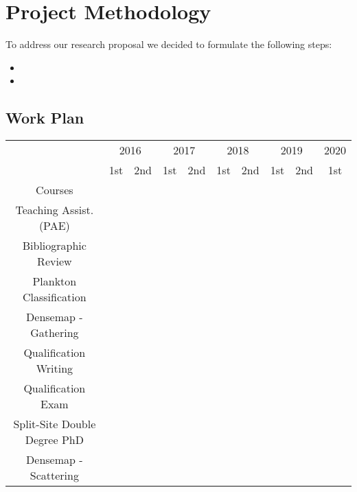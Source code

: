 \chapter{Project Methodology}
\label{ch04:methodology}

To address our research proposal we decided to formulate the following steps:

\begin{itemize}
\item 
\item 
\end{itemize}


\section{Work Plan}
\label{sec:work-plan}

\begin{table}[ht!]
  \center
  \begin{tabular}{|c|c|c|c|c|c|c|c|c|c|}\hline
    & \multicolumn{2}{c|}{2016} & \multicolumn{2}{c|}{2017} & \multicolumn{2}{c|}{2018} & \multicolumn{2}{c|}{2019} & \multicolumn{1}{c|}{2020} \\ \cline{2-10}
    \raisebox{1.5ex}{Activity} & 1st & 2nd & 1st & 2nd & 1st & 2nd & 1st & 2nd & 1st \\ \hline \hline
    Courses & \cellcolor{green!25} & \cellcolor{green!25} &  &  &  &  & & & \\ \hline
    Teaching Assist. (PAE) & & & \cellcolor{green!25} &  &  &  & & & \\ \hline
    Bibliographic Review & \cellcolor{green!25} & \cellcolor{green!25} & \cellcolor{green!25} & \cellcolor{green!25} & \cellcolor{green!25} & \cellcolor{blue!25} & \cellcolor{blue!25} & \cellcolor{blue!25} & \\ \hline 
    Plankton Classification & & & \cellcolor{green!25} & \cellcolor{green!25} &  & & &  & \\ \hline
    Densemap - Gathering & & & &  & \cellcolor{green!25}  & & &  & \\ \hline
    Qualification Writing & & & & & \cellcolor{green!25} & &  & & \\ \hline
    Qualification Exam & & & & & \cellcolor{green!25} & & & & \\ \hline
    Split-Site Double Degree PhD & & & & & & \cellcolor{blue!25} & \cellcolor{blue!25} & & \\ \hline
    Densemap - Scattering & & & &  & & \cellcolor{blue!25} & &  & \\ \hline

\end{tabular}
\end{table}
